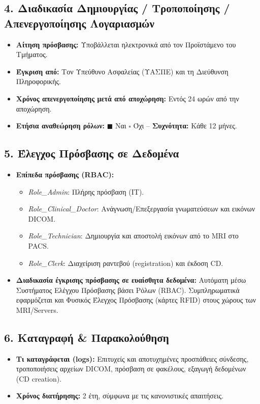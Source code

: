 \documentclass[11pt,a4paper]{article}
\begin{document}
\subsection*{4. Διαδικασία Δημιουργίας / Τροποποίησης / Απενεργοποίησης Λογαριασμών}
\begin{itemize}
    \item \textbf{Αίτηση πρόσβασης:} Υποβάλλεται ηλεκτρονικά από τον Προϊστάμενο του Τμήματος.
    \item \textbf{Έγκριση από:} Τον Υπεύθυνο Ασφαλείας (ΥΑΣΠΕ) και τη Διεύθυνση Πληροφορικής.
    \item \textbf{Χρόνος απενεργοποίησης μετά από αποχώρηση:} Εντός 24 ωρών από την αποχώρηση.
    \item \textbf{Ετήσια αναθεώρηση ρόλων:} $\blacksquare$ Ναι \quad $\square$ Όχι -- \textbf{Συχνότητα:} Κάθε 12 μήνες.
\end{itemize}

\subsection*{5. Έλεγχος Πρόσβασης σε Δεδομένα}
\begin{itemize}
    \item \textbf{Επίπεδα πρόσβασης (RBAC):}
    \begin{itemize}
        \item \textit{Role\_Admin}: Πλήρης πρόσβαση (ΙΤ).
        \item \textit{Role\_Clinical\_Doctor}: Ανάγνωση/Επεξεργασία γνωματεύσεων και εικόνων DICOM.
        \item \textit{Role\_Technician}: Δημιουργία και αποστολή εικόνων από το MRI στο PACS.
        \item \textit{Role\_Clerk}: Διαχείριση ραντεβού (registration) και έκδοση CD.
    \end{itemize}
    \item \textbf{Διαδικασία έγκρισης πρόσβασης σε ευαίσθητα δεδομένα:} Αυτόματη μέσω Συστήματος Ελέγχου Πρόσβασης βάσει Ρόλων (RBAC). Συμπληρωματικά εφαρμόζεται και Φυσικός Έλεγχος Πρόσβασης (κάρτες RFID) στους χώρους των MRI/Servers.
\end{itemize}

\subsection*{6. Καταγραφή \& Παρακολούθηση}
\begin{itemize}
    \item \textbf{Τι καταγράφεται (logs):} Επιτυχείς και αποτυχημένες προσπάθειες σύνδεσης, τροποποιήσεις αρχείων DICOM, πρόσβαση σε φακέλους, εξαγωγή δεδομένων (CD creation).
    \item \textbf{Χρόνος διατήρησης:} 2 έτη, σύμφωνα με τις κανονιστικές απαιτήσεις.
\end{itemize}
\end{document}
